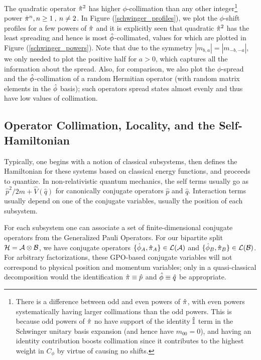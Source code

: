 \documentclass[aps,pra,onecolumn,nofootinbib,notitlepage,11pt,tightenlines]{revtex4-1}
\begin{document}
The quadratic operator $\hat{\pi}^{2}$ has higher $\phi$-collimation than any other integer\footnote{There is a difference between odd and even powers of $\hat{\pi}$, with even powers systematically having larger collimations than the odd powers. This is because odd powers of $\hat{\pi}$ no have support of the identity $\hat{\mathbb{I}}$ term in the Schwinger unitary basis expansion (and hence have $m_{00} = 0$), and having an identity contribution boosts collimation since it contributes to the highest weight in $C_{\phi}$ by virtue of causing no shifts.} power $\hat{\pi}^{n}, n \geq 1 \: , \: n \neq 2$. In Figure (\ref{schwinger_profiles}), we plot the $\phi$-shift profiles for a few powers of $\hat{\pi}$ and it is explicitly seen that quadratic $\hat{\pi}^{2}$ has the least spreading and hence is most $\hat{\phi}$-collimated, values for which are plotted in Figure (\ref{schwinger_powers}). Note that due to the symmetry $|m_{b,a}| = |m_{-b,-a}|$, we only needed to plot the positive half for $a > 0$, which captures all the information about the spread. Also, for comparison, we also plot the $\phi$-spread and the $\hat{\phi}$-collimation of a {random} Hermitian operator (with random matrix elements in the $\hat{\phi}$ basis); such operators spread states almost evenly and thus have low values of collimation. 

\subsection{Operator Collimation, Locality, and the Self-Hamiltonian}
 \label{sec:collimation}
 
Typically, one begins with a notion of classical subsystems, then defines the Hamiltonian for these systems based on classical energy functions, and proceeds to quantize. In non-relativistic quantum mechanics, the self terms usually go as $~ \hat{p}^2/2m + \hat{V}(\hat{q})$ for canonically conjugate operators $\hat{p}$ and $\hat{q}$. Interaction terms usually depend on one of the conjugate variables, usually the position of each subsystem.  

For each subsystem one can associate a set of finite-dimensional conjugate operators from the Generalized Pauli Operators.
For our bipartite split $\mathcal{H} = \mathcal{A} \otimes \mathcal{B}$, we have conjugate operators $\{\hat{\phi}_{A},\hat{\pi}_{A}\} \in \mathcal{L}(\mathcal{A})$ and $\{\hat{\phi}_{B},\hat{\pi}_{B} \} \in \mathcal{L}(\mathcal{B})$. For arbitrary factorizations, these GPO-based conjugate variables will not correspond to physical position and momentum variables;  only in a quasi-classical decomposition would the identification $\hat{\pi} \equiv \hat{p}$ and $\hat{\phi} \equiv \hat{q}$ be appropriate. 
\end{document}
